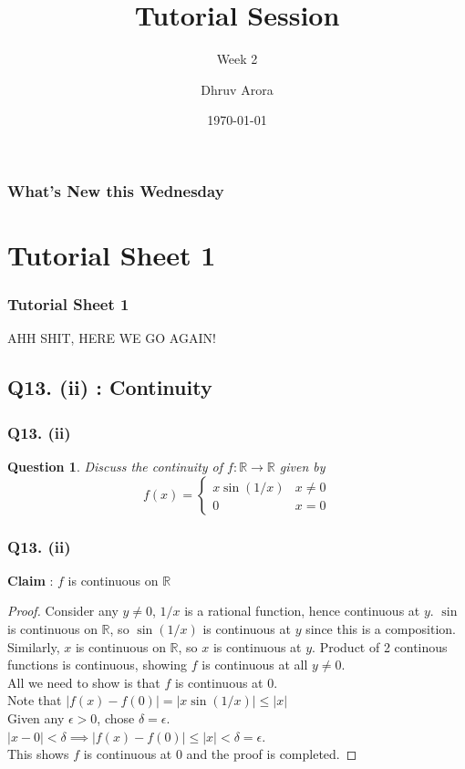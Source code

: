 \documentclass[handout,aspectratio=169]{beamer}
\title{Tutorial Session}
\subtitle{Week 2}
\author{Dhruv Arora}
\institute{Sophomore, Dept of CSE}
\date{\today}
\newtheorem{qsn}{Question}
\newcommand{\bR}{\mathbb{R}}
\begin{document}
\begin{frame}[plain]
\titlepage
\end{frame}

\begin{frame}[plain]
\frametitle{What's New this Wednesday}
\tableofcontents
\end{frame}

\section{Tutorial Sheet 1}

\begin{frame}
\frametitle{Tutorial Sheet 1}
\pause
AHH SHIT, HERE WE GO AGAIN!
\end{frame}

\subsection{Q13. (ii) : Continuity}

\begin{frame}
\frametitle{Q13. (ii)}
\pause
\begin{qsn}
Discuss the continuity of $f : \bR \to \bR$ given by
$$f(x) = 
\begin{cases}
x \sin (1/x) & x\neq 0\\
0 & x=0
\end{cases}$$
\end{qsn}
\end{frame}

\begin{frame}
\frametitle{Q13. (ii)}
\textbf{Claim} : $f$ is continuous on $\bR$
\pause
\begin{proof}
Consider any $y\neq 0$, $1/x$ is a rational function, hence continuous at $y$. $\sin$ is continuous on $\bR$, so $\sin(1/x)$ is continuous at $y$ since this is a composition. Similarly, $x$ is continuous on $\bR$, so $x$ is continuous at $y$. Product of 2 continous functions is continuous, showing $f$ is continuous at all $y\neq 0$.\\[1mm] \pause
All we need to show is that $f$ is continuous at $0$.\\ \pause
Note that $|f(x)-f(0)| = |x\sin(1/x)| \leq |x|$\\ \pause
Given any $\epsilon>0$, chose $\delta = \epsilon$.\\ \pause
$|x-0|<\delta \implies |f(x)-f(0)| \leq |x| < \delta = \epsilon$.\\
This shows $f$ is continuous at 0 and the proof is completed.
\end{proof}
\end{frame}
\end{document}
